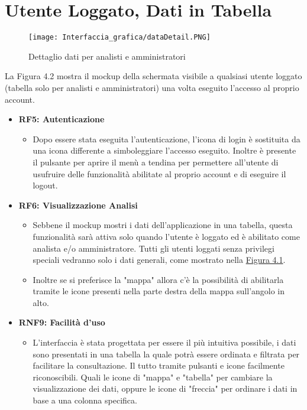 \newpage
\section{Utente Loggato, Dati in Tabella}

    \begin{figure}[H]
        \center
        \texttt{[image: Interfaccia\_grafica/dataDetail.PNG]}
        \caption{Dettaglio dati per analisti e amministratori}
    \end{figure}    

    La Figura 4.2 mostra il mockup della schermata visibile a qualsiasi utente loggato (tabella solo per analisti e amministratori) una volta eseguito l'accesso al proprio account.

    \begin{itemize}
        \item \textbf{RF5: Autenticazione} \begin{itemize} 
            \item Dopo essere stata eseguita l'autenticazione, l'icona di login è sostituita da una icona differente a simboleggiare l'accesso eseguito. Inoltre è presente il pulsante per aprire il menù a tendina per permettere all'utente di usufruire delle funzionalità abilitate al proprio account e di eseguire il logout.
        \end{itemize}
        \item \textbf{RF6: Visualizzazione Analisi} \begin{itemize}
            \item Sebbene il mockup mostri i dati dell'applicazione in una tabella, questa funzionalità sarà attiva solo quando l'utente è loggato ed è abilitato come analista e/o amministratore. Tutti gli utenti loggati senza privilegi speciali vedranno solo i dati generali, come mostrato nella \hyperref[fig:4.1]{Figura 4.1}.
            \item Inoltre se si preferisce la "mappa" allora c'è la possibilità di abilitarla tramite le icone presenti nella parte destra della mappa sull'angolo in alto. 
        \end{itemize}
        \item \textbf{RNF9: Facilità d’uso} \begin{itemize}
            \item L'interfaccia è stata progettata per essere il più intuitiva possibile, i dati sono presentati in una tabella la quale potrà essere ordinata e filtrata per facilitare la consultazione. Il tutto tramite pulsanti e icone facilmente riconoscibili. Quali le icone di "mappa" e "tabella" per cambiare la visualizzazione dei dati, oppure le icone di "freccia" per ordinare i dati in base a una colonna specifica.

\end{itemize}
\end{itemize}
